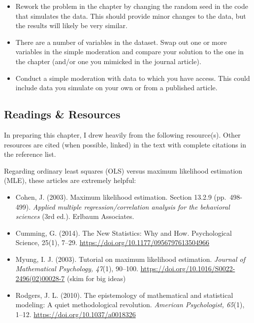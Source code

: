 \documentclass[
  11pt,
]{book}
\providecommand{\tightlist}{%
  \setlength{\itemsep}{0pt}\setlength{\parskip}{0pt}}
\begin{document}
\begin{itemize}
\tightlist
\item
  Rework the problem in the chapter by changing the random seed in the code that simulates the data. This should provide minor changes to the data, but the results will likely be very similar.
\item
  There are a number of variables in the dataset. Swap out one or more variables in the simple moderation and compare your solution to the one in the chapter (and/or one you mimicked in the journal article).
\item
  Conduct a simple moderation with data to which you have access. This could include data you simulate on your own or from a published article.
\end{itemize}

\hypertarget{readings-resources-6}{%
\subsection{Readings \& Resources}\label{readings-resources-6}}

In preparing this chapter, I drew heavily from the following resource(s). Other resources are cited (when possible, linked) in the text with complete citations in the reference list.

Regarding ordinary least squares (OLS) versus maximum likelihood estimation (MLE), these articles are extremely helpful:

\begin{itemize}
\tightlist
\item
  Cohen, J. (2003). Maximum likelihood estimation. Section 13.2.9 (pp.~498-499). \emph{Applied multiple regression/correlation analysis for the behavioral sciences} (3rd ed.). Erlbaum Associates.
\item
  Cumming, G. (2014). The New Statistics: Why and How. Psychological Science, 25(1), 7--29. \url{https://doi.org/10.1177/0956797613504966}
\item
  Myung, I. J. (2003). Tutorial on maximum likelihood estimation. \emph{Journal of Mathematical Psychology, 47}(1), 90--100. \url{https://doi.org/10.1016/S0022-2496(02)00028-7} (skim for big ideas)
\item
  Rodgers, J. L. (2010). The epistemology of mathematical and statistical modeling: A quiet methodological revolution. \emph{American Psychologist, 65}(1), 1--12. \url{https://doi.org/10.1037/a0018326}
\end{itemize}
\end{document}
